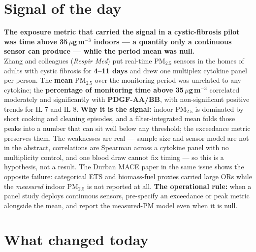 \documentclass[10pt]{article}
\begin{document}
\vspace{6mm}

\section*{\sffamily\bfseries\color{Deep}Signal of the day}
\vspace{-1.5mm}{\color{Amber}\rule{\linewidth}{1.1pt}}\vspace{2.5mm}

\begin{keybox}
{\sffamily\bfseries\small\color{Deep}The exposure metric that carried the signal in a
cystic-fibrosis pilot was time above 35\,$\mu$g\,m$^{-3}$ indoors --- a quantity only a continuous
sensor can produce --- while the period mean was null.}\\[1.4mm]
\footnotesize
Zhang and colleagues (\textit{Respir Med}) put real-time PM$_{2.5}$ sensors in the homes of adults
with cystic fibrosis for \textbf{4--11 days} and drew one multiplex cytokine panel per person. The
\textbf{mean} PM$_{2.5}$ over the monitoring period was unrelated to any cytokine; the
\textbf{percentage of monitoring time above 35\,$\mu$g\,m$^{-3}$} correlated moderately and
significantly with \textbf{PDGF-AA/BB}, with non-significant positive trends for IL-7 and IL-8.
\textbf{Why it is the signal:} indoor PM$_{2.5}$ is dominated by short cooking and cleaning
episodes, and a filter-integrated mean folds those peaks into a number that can sit well below
any threshold; the exceedance metric preserves them. The weaknesses are real --- sample size and
sensor model are not in the abstract, correlations are Spearman across a cytokine panel with no
multiplicity control, and one blood draw cannot fix timing --- so this is a hypothesis, not a
result. The Durban MACE paper in the same issue shows the opposite failure: categorical ETS and
biomass-fuel proxies carried large ORs while the \emph{measured} indoor PM$_{2.5}$ is not reported
at all. \textbf{The operational rule:} when a panel study deploys continuous sensors, pre-specify
an exceedance or peak metric alongside the mean, and report the measured-PM model even when it
is null.\par
\end{keybox}

\vspace{3mm}

\section*{\sffamily\bfseries\color{Deep}What changed today}
\vspace{-1.5mm}{\color{Amber}\rule{\linewidth}{1.1pt}}\vspace{2.5mm}
\end{document}
